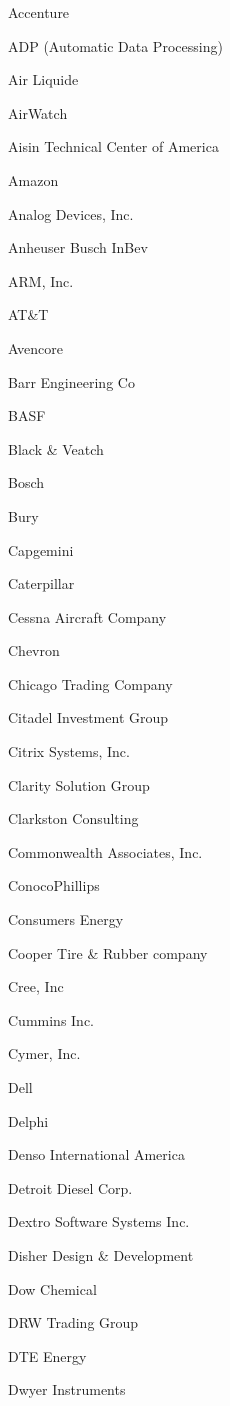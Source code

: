 \documentclass[twoside]{article}
\begin{document}
\begin{center}
\begin{multicols}{5}
\begin{FlushLeft}
\begin{compactitem}
\item Accenture
\item ADP (Automatic Data Processing)
\item Air Liquide
\item AirWatch
\item Aisin Technical Center of America
\item Amazon
\item Analog Devices, Inc.
\item Anheuser Busch InBev
\item ARM, Inc.
\item AT\&T
\item Avencore
\item Barr Engineering Co
\item BASF
\item Black \& Veatch
\item Bosch
\item Bury
\item Capgemini
\item Caterpillar
\item Cessna Aircraft Company
\item Chevron
\item Chicago Trading Company
\item Citadel Investment Group
\item Citrix Systems, Inc.
\item Clarity Solution Group
\item Clarkston Consulting
\item Commonwealth Associates, Inc.
\item ConocoPhillips
\item Consumers Energy
\item Cooper Tire \& Rubber company
\item Cree, Inc
\item Cummins Inc.
\item Cymer, Inc.
\item Dell
\item Delphi
\item Denso International America
\item Detroit Diesel Corp.
\item Dextro Software Systems Inc.
\item Disher Design \& Development
\item Dow Chemical
\item DRW Trading Group
\item DTE Energy
\item Dwyer Instruments

\end{compactitem}
\end{FlushLeft}
\end{multicols}
\end{center}
\end{document}

